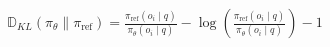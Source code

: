 \documentclass[preview]{standalone}
\begin{document}
\begin{align*}
\mathbb{D}_{KL}( \pi_\theta \| \pi_{\text{ref}} ) =  \frac{\pi_{\text{ref}}(o_i \mid q)}{\pi_\theta(o_i \mid q)} - \log \left( \frac{\pi_{\text{ref}}(o_i \mid q)}{\pi_\theta(o_i \mid q)} \right) - 1
\end{align*}
\end{document}
